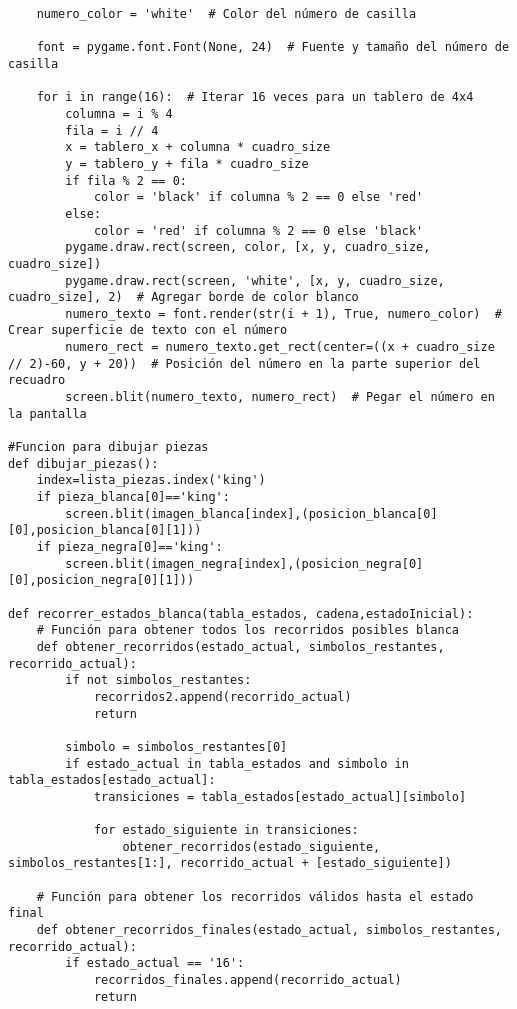 \begin{lstlisting}
    numero_color = 'white'  # Color del número de casilla

    font = pygame.font.Font(None, 24)  # Fuente y tamaño del número de casilla

    for i in range(16):  # Iterar 16 veces para un tablero de 4x4
        columna = i % 4
        fila = i // 4
        x = tablero_x + columna * cuadro_size
        y = tablero_y + fila * cuadro_size
        if fila % 2 == 0:
            color = 'black' if columna % 2 == 0 else 'red'
        else:
            color = 'red' if columna % 2 == 0 else 'black'
        pygame.draw.rect(screen, color, [x, y, cuadro_size, cuadro_size])
        pygame.draw.rect(screen, 'white', [x, y, cuadro_size, cuadro_size], 2)  # Agregar borde de color blanco
        numero_texto = font.render(str(i + 1), True, numero_color)  # Crear superficie de texto con el número
        numero_rect = numero_texto.get_rect(center=((x + cuadro_size // 2)-60, y + 20))  # Posición del número en la parte superior del recuadro
        screen.blit(numero_texto, numero_rect)  # Pegar el número en la pantalla

#Funcion para dibujar piezas
def dibujar_piezas():
    index=lista_piezas.index('king')
    if pieza_blanca[0]=='king':     
        screen.blit(imagen_blanca[index],(posicion_blanca[0][0],posicion_blanca[0][1]))
    if pieza_negra[0]=='king':     
        screen.blit(imagen_negra[index],(posicion_negra[0][0],posicion_negra[0][1]))
          
def recorrer_estados_blanca(tabla_estados, cadena,estadoInicial):
    # Función para obtener todos los recorridos posibles blanca
    def obtener_recorridos(estado_actual, simbolos_restantes, recorrido_actual):
        if not simbolos_restantes:
            recorridos2.append(recorrido_actual)
            return

        simbolo = simbolos_restantes[0]
        if estado_actual in tabla_estados and simbolo in tabla_estados[estado_actual]:
            transiciones = tabla_estados[estado_actual][simbolo]

            for estado_siguiente in transiciones:
                obtener_recorridos(estado_siguiente, simbolos_restantes[1:], recorrido_actual + [estado_siguiente])

    # Función para obtener los recorridos válidos hasta el estado final
    def obtener_recorridos_finales(estado_actual, simbolos_restantes, recorrido_actual):
        if estado_actual == '16':
            recorridos_finales.append(recorrido_actual)
            return


\end{lstlisting}
